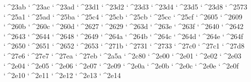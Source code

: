 \XeTeXcharclass `^^^^23ab \symbols
\XeTeXcharclass `^^^^23ac \symbols
\XeTeXcharclass `^^^^23ad \symbols
\XeTeXcharclass `^^^^23d1 \symbols
\XeTeXcharclass `^^^^23d2 \symbols
\XeTeXcharclass `^^^^23d3 \symbols
\XeTeXcharclass `^^^^23d4 \symbols
\XeTeXcharclass `^^^^23d5 \symbols
\XeTeXcharclass `^^^^23d8 \symbols
\XeTeXcharclass `^^^^2573 \symbols
\XeTeXcharclass `^^^^25a1 \symbols
\XeTeXcharclass `^^^^25ad \symbols
\XeTeXcharclass `^^^^25ba \symbols
\XeTeXcharclass `^^^^25c4 \symbols
\XeTeXcharclass `^^^^25cb \symbols
\XeTeXcharclass `^^^^25cb \symbols
\XeTeXcharclass `^^^^25cc \symbols
\XeTeXcharclass `^^^^25cf \symbols
\XeTeXcharclass `^^^^2605 \symbols
\XeTeXcharclass `^^^^2609 \symbols
\XeTeXcharclass `^^^^260b \symbols
\XeTeXcharclass `^^^^260c \symbols
\XeTeXcharclass `^^^^260d \symbols
\XeTeXcharclass `^^^^2627 \symbols
\XeTeXcharclass `^^^^2629 \symbols
\XeTeXcharclass `^^^^263d \symbols
\XeTeXcharclass `^^^^263e \symbols
\XeTeXcharclass `^^^^263f \symbols
\XeTeXcharclass `^^^^2640 \symbols
\XeTeXcharclass `^^^^2642 \symbols
\XeTeXcharclass `^^^^2643 \symbols
\XeTeXcharclass `^^^^2644 \symbols
\XeTeXcharclass `^^^^2648 \symbols
\XeTeXcharclass `^^^^2649 \symbols
\XeTeXcharclass `^^^^264a \symbols
\XeTeXcharclass `^^^^264b \symbols
\XeTeXcharclass `^^^^264c \symbols
\XeTeXcharclass `^^^^264d \symbols
\XeTeXcharclass `^^^^264e \symbols
\XeTeXcharclass `^^^^264f \symbols
\XeTeXcharclass `^^^^2650 \symbols
\XeTeXcharclass `^^^^2651 \symbols
\XeTeXcharclass `^^^^2652 \symbols
\XeTeXcharclass `^^^^2653 \symbols
\XeTeXcharclass `^^^^271b \symbols
\XeTeXcharclass `^^^^2731 \symbols
\XeTeXcharclass `^^^^2733 \symbols
\XeTeXcharclass `^^^^27c0 \symbols
\XeTeXcharclass `^^^^27c1 \symbols
\XeTeXcharclass `^^^^27d8 \symbols
\XeTeXcharclass `^^^^27e6 \symbols
\XeTeXcharclass `^^^^27e7 \symbols
\XeTeXcharclass `^^^^27ea \symbols
\XeTeXcharclass `^^^^27eb \symbols
\XeTeXcharclass `^^^^2a5a \symbols
\XeTeXcharclass `^^^^2c80 \symbols
\XeTeXcharclass `^^^^2e00 \symbols
\XeTeXcharclass `^^^^2e01 \symbols
\XeTeXcharclass `^^^^2e02 \symbols
\XeTeXcharclass `^^^^2e03 \symbols
\XeTeXcharclass `^^^^2e04 \symbols
\XeTeXcharclass `^^^^2e05 \symbols
\XeTeXcharclass `^^^^2e06 \symbols
\XeTeXcharclass `^^^^2e07 \symbols
\XeTeXcharclass `^^^^2e09 \symbols
\XeTeXcharclass `^^^^2e0a \symbols
\XeTeXcharclass `^^^^2e0b \symbols
\XeTeXcharclass `^^^^2e0c \symbols
\XeTeXcharclass `^^^^2e0e \symbols
\XeTeXcharclass `^^^^2e0f \symbols
\XeTeXcharclass `^^^^2e10 \symbols
\XeTeXcharclass `^^^^2e11 \symbols
\XeTeXcharclass `^^^^2e12 \symbols
\XeTeXcharclass `^^^^2e13 \symbols
\XeTeXcharclass `^^^^2e14 \symbols
